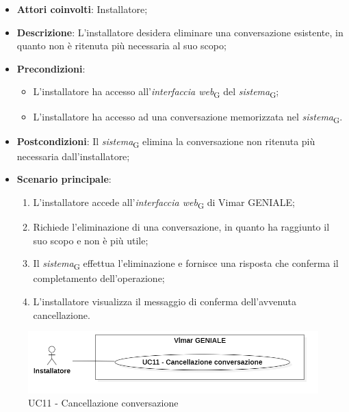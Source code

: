 \begin{itemize}
    \item \textbf{Attori coinvolti}: Installatore;
    \item \textbf{Descrizione}: L’installatore desidera eliminare una conversazione esistente, in quanto non è ritenuta più necessaria al suo scopo;
    \item \textbf{Precondizioni}: 
    \begin{itemize}
        \item L’installatore ha accesso all’\textit{interfaccia web}\textsubscript{G} del \textit{sistema}\textsubscript{G};
        \item L’installatore ha accesso ad una conversazione memorizzata nel \textit{sistema}\textsubscript{G}.
    \end{itemize}
    \item \textbf{Postcondizioni}: Il \textit{sistema}\textsubscript{G} elimina la conversazione non ritenuta più necessaria dall’installatore;
    \item \textbf{Scenario principale}:
    \begin{enumerate}
        \item L’installatore accede all’\textit{interfaccia web}\textsubscript{G} di Vimar GENIALE;
        \item Richiede l’eliminazione di una conversazione, in quanto ha raggiunto il suo scopo e non è più utile;
        \item Il \textit{sistema}\textsubscript{G} effettua l’eliminazione e fornisce una risposta che conferma il completamento dell’operazione;
        \item L’installatore visualizza il messaggio di conferma dell’avvenuta cancellazione.
    \end{enumerate}
\end{itemize}
\begin{figure}[H]
\centering
\includegraphics[width=1\textwidth]{contents/casi_duso/png/UC11.png}
\caption{UC11 - Cancellazione conversazione}
\end{figure}



